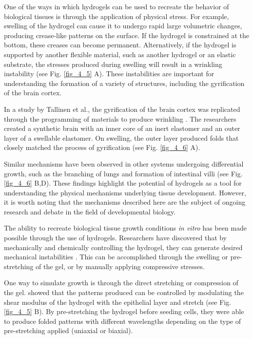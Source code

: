 One of the ways in which hydrogels can be used to recreate the behavior of biological tissues is through the application of physical stress. For example, swelling of the hydrogel can cause it to undergo rapid large volumetric changes, producing crease-like patterns on the surface. If the hydrogel is constrained at the bottom, these creases can become permanent. Alternatively, if the hydrogel is supported by another flexible material, such as another hydrogel or an elastic substrate, the stresses produced during swelling will result in a wrinkling instability (see Fig. \ref{fig_4_5} A). These instabilities are important for understanding the formation of a variety of structures, including the gyrification of the brain cortex.

In a study by Tallinen et al., the gyrification of the brain cortex was replicated through the programming of materials to produce wrinkling \cite{tallinen2016}. The researchers created a synthetic brain with an inner core of an inert elastomer and an outer layer of a swellable elastomer. On swelling, the outer layer produced folds that closely matched the process of gyrification (see Fig. \ref{fig_4_6} A).

Similar mechanisms have been observed in other systems undergoing differential growth, such as the branching of lungs and formation of intestinal villi \cite{varner2015,shyer2013} (see Fig. \ref{fig_4_6} B,D). These findings highlight the potential of hydrogels as a tool for understanding the physical mechanisms underlying tissue development. However, it is worth noting that the mechanisms described here are the subject of ongoing research and debate in the field of developmental biology.

The ability to recreate biological tissue growth conditions \textit{in vitro} has been made possible through the use of hydrogels. Researchers have discovered that by mechanically and chemically controlling the hydrogel, they can generate desired mechanical instabilities \cite{dervaux2012}. This can be accomplished through the swelling or pre-stretching of the gel, or by manually applying compressive stresses.

One way to simulate growth is through the direct stretching or compression of the gel. \citet{chan2018} showed that the patterns produced can be controlled by modulating the shear modulus of the hydrogel with the epithelial layer and stretch (see Fig. \ref{fig_4_5} B). By pre-stretching the hydrogel before seeding cells, they were able to produce folded patterns with different wavelengths depending on the type of pre-stretching applied (uniaxial or biaxial). 

